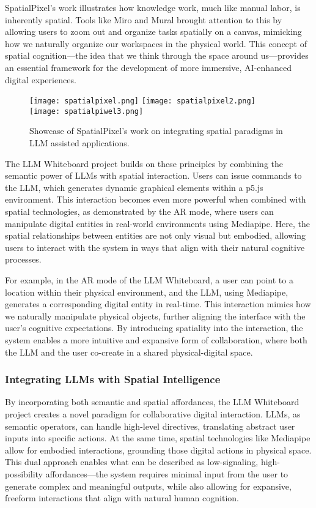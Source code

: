 SpatialPixel's work illustrates how knowledge work, much like manual labor, is inherently spatial.
Tools like Miro and Mural brought attention to this by allowing users to zoom out and organize tasks spatially on a canvas, mimicking how we naturally organize our workspaces in the physical world.
This concept of spatial cognition—the idea that we think through the space around us—provides an essential framework for the development of more immersive, AI-enhanced digital experiences.

\begin{figure}[!h]
    \centering
    \texttt{[image: spatialpixel.png]}
    \texttt{[image: spatialpixel2.png]}
    \texttt{[image: spatialpiwel3.png]}
    \caption{Showcase of SpatialPixel's work on integrating spatial paradigms in LLM assisted applications.}
    \vspace{0.1cm}
    \label{fig:spatialpixel}
\end{figure}

The LLM Whiteboard project builds on these principles by combining the semantic power of LLMs with spatial interaction.
Users can issue commands to the LLM, which generates dynamic graphical elements within a p5.js environment.
This interaction becomes even more powerful when combined with spatial technologies, as demonstrated by the AR mode, where users can manipulate digital entities in real-world environments using Mediapipe.
Here, the spatial relationships between entities are not only visual but embodied, allowing users to interact with the system in ways that align with their natural cognitive processes.

For example, in the AR mode of the LLM Whiteboard, a user can point to a location within their physical environment, and the LLM, using Mediapipe, generates a corresponding digital entity in real-time. This interaction mimics how we naturally manipulate physical objects, further aligning the interface with the user’s cognitive expectations. By introducing spatiality into the interaction, the system enables a more intuitive and expansive form of collaboration, where both the LLM and the user co-create in a shared physical-digital space.


\subsubsection{Integrating LLMs with Spatial Intelligence}
By incorporating both semantic and spatial affordances, the LLM Whiteboard project creates a novel paradigm for collaborative digital interaction.
LLMs, as semantic operators, can handle high-level directives, translating abstract user inputs into specific actions.
At the same time, spatial technologies like Mediapipe allow for embodied interactions, grounding those digital actions in physical space.
This dual approach enables what can be described as low-signaling, high-possibility affordances—the system requires minimal input from the user to generate complex and meaningful outputs, while also allowing for expansive, freeform interactions that align with natural human cognition.

